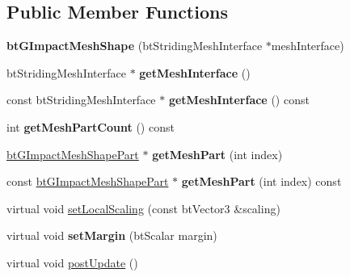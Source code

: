 \subsection*{Public Member Functions}
\begin{DoxyCompactItemize}
\item 
\mbox{\label{classbtGImpactMeshShape_aa620d8c83b9f235068509f7caff0862f}} 
{\bfseries bt\+G\+Impact\+Mesh\+Shape} (bt\+Striding\+Mesh\+Interface $\ast$mesh\+Interface)
\item 
\mbox{\label{classbtGImpactMeshShape_ac4f392b95775eaf255efcd9b6a1383c2}} 
bt\+Striding\+Mesh\+Interface $\ast$ {\bfseries get\+Mesh\+Interface} ()
\item 
\mbox{\label{classbtGImpactMeshShape_a18b9a9ca4e207a1032673a4f2cd5accb}} 
const bt\+Striding\+Mesh\+Interface $\ast$ {\bfseries get\+Mesh\+Interface} () const
\item 
\mbox{\label{classbtGImpactMeshShape_a193bab01f3cbbf640d2ddf28763b10ba}} 
int {\bfseries get\+Mesh\+Part\+Count} () const
\item 
\mbox{\label{classbtGImpactMeshShape_abac8a0def4182767d8556d7ed8b08a7c}} 
\hyperlink{classbtGImpactMeshShapePart}{bt\+G\+Impact\+Mesh\+Shape\+Part} $\ast$ {\bfseries get\+Mesh\+Part} (int index)
\item 
\mbox{\label{classbtGImpactMeshShape_a106d86bb0104c72dd18060985a4e6d70}} 
const \hyperlink{classbtGImpactMeshShapePart}{bt\+G\+Impact\+Mesh\+Shape\+Part} $\ast$ {\bfseries get\+Mesh\+Part} (int index) const
\item 
virtual void \hyperlink{classbtGImpactMeshShape_aed8d5e4b2e75538109909d44b244bc35}{set\+Local\+Scaling} (const bt\+Vector3 \&scaling)
\item 
\mbox{\label{classbtGImpactMeshShape_aab65bdcfd34867e88a505a6377e4f79b}} 
virtual void {\bfseries set\+Margin} (bt\+Scalar margin)
\item 
\mbox{\label{classbtGImpactMeshShape_afbf7ae3408bc0ab975c46ed65820a4b2}} 
virtual void \hyperlink{classbtGImpactMeshShape_afbf7ae3408bc0ab975c46ed65820a4b2}{post\+Update} ()

\end{DoxyCompactItemize}
